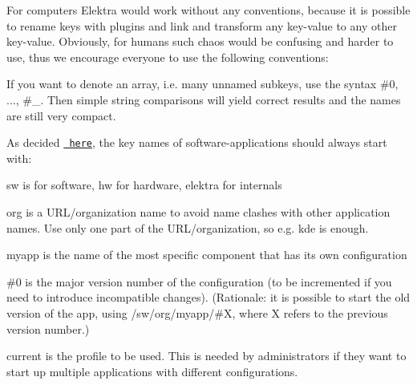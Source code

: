 For computers Elektra would work without any conventions, because it is possible to rename keys with plugins and link and transform any key-\/value to any other key-\/value. Obviously, for humans such chaos would be confusing and harder to use, thus we encourage everyone to use the following conventions\+:

If you want to denote an array, i.\+e. many unnamed subkeys, use the syntax {\ttfamily \#0}, ..., {\ttfamily \#\+\_}. Then simple string comparisons will yield correct results and the names are still very compact.

As decided \href{https://github.com/ElektraInitiative/libelektra/issues/302}{\texttt{ here}}, the key names of software-\/applications should always start with\+:


\begin{DoxyCode}{0}
\end{DoxyCode}



\begin{DoxyItemize}
\item {\ttfamily sw} is for software, {\ttfamily hw} for hardware, {\ttfamily elektra} for internals
\item {\ttfamily org} is a U\+R\+L/organization name to avoid name clashes with other application names. Use only one part of the U\+R\+L/organization, so e.\+g. {\ttfamily kde} is enough.
\item {\ttfamily myapp} is the name of the most specific component that has its own configuration
\item {\ttfamily \#0} is the major version number of the configuration (to be incremented if you need to introduce incompatible changes). (Rationale\+: it is possible to start the old version of the app, using {\ttfamily /sw/org/myapp/\#X}, where {\ttfamily X} refers to the previous version number.)
\item {\ttfamily current} is the profile to be used. This is needed by administrators if they want to start up multiple applications with different configurations.
\end{DoxyItemize}


